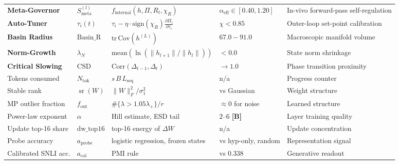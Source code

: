 \documentclass[11pt,a4paper]{article}
\newcommand{\sB}{\textbf{[B]}}
\begin{document}
\begin{longtable}{p{2.5cm} p{1.9cm} p{4.7cm} p{2.5cm} p{2.9cm}}
\textbf{Meta-Governor} & $S_{\text{meta}}^{(l)}$ & $f_{\text{internal}}(h, \Pi, R_t, \chi_R)$ & $\alpha_{\text{eff}} \in [0.40, 1.20]$ & In-vivo forward-pass self-regulation \\
\textbf{Auto-Tuner} & $\tau_i(t)$ & $\tau_i - \eta \cdot \text{sign}(\chi_R) \frac{\partial \Pi_i}{\partial \tau_i}$ & $\chi < 0.85$ & Outer-loop set-point calibration \\
\textbf{Basin Radius} & $\text{Basin\_R}$ & $\mathrm{tr}\,\mathrm{Cov}(h^{(L)})$ & $67.0 - 91.0$ & Macroscopic manifold volume \\
\textbf{Norm-Growth} & $\lambda_N$ & $\text{mean}(\ln(\|h_{l+1}\|/\|h_l\|))$ & $< 0.0$ & State norm shrinkage \\
\textbf{Critical Slowing} & $\text{CSD}$ & $\text{Corr}(\Delta_{t-1}, \Delta_t)$ & $\to 1.0$ & Phase transition proximity \\
Tokens consumed & $N_{\text{tok}}$ & $s\,B\,L_{\text{seq}}$ & n/a & Progress counter \\
Stable rank & $\operatorname{sr}(W)$ & $\|W\|_F^2/\sigma_1^2$ & vs Gaussian & Weight structure \\
MP outlier fraction & $f_{\text{out}}$ & $\#\{\lambda>1.05\lambda_+\}/r$ & $\approx 0$ for noise & Learned structure \\
Power-law exponent & $\alpha$ & Hill estimate, ESD tail & $2$--$6$ \sB{} & Layer training quality \\
Update top-16 share & $\text{dw\_top16}$ & top-16 energy of $\Delta W$ & n/a & Update concentration \\
Probe accuracy & $a_{\text{probe}}$ & logistic regression, frozen states & vs hyp-only, random & Representation signal \\
Calibrated SNLI acc. & $a_{\text{cal}}$ & PMI rule & vs $0.338$ & Generative readout \\

\end{longtable}
\end{document}
